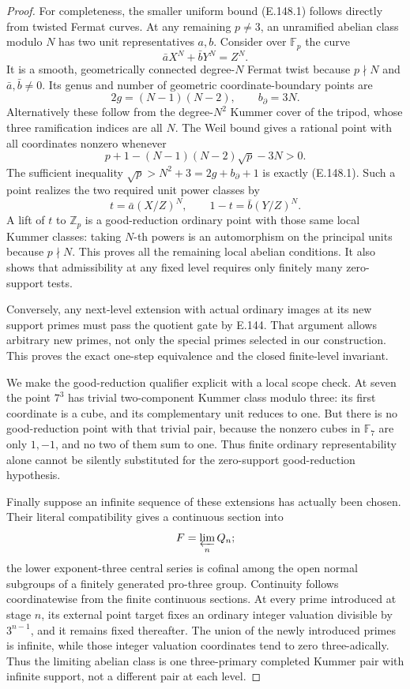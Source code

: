 \begin{proof}
For completeness, the smaller uniform
bound (E.148.1) follows directly from
twisted Fermat curves.
At any remaining \(p\ne3\), an unramified
abelian class modulo \(N\) has two
unit representatives \(a,b\).
Consider over \(\mathbb F_p\) the curve
\[
                  \bar aX^N+\bar bY^N=Z^N.
 \tag{E.148.7}
\]
It is a smooth, geometrically connected
degree-\(N\) Fermat twist because
\(p\nmid N\) and \(\bar a,\bar b\ne0\).
Its genus and number of geometric
coordinate-boundary points are
\[
          2g=(N-1)(N-2),\qquad b_{\partial}=3N.
 \tag{E.148.8}
\]
Alternatively these follow from the
degree-\(N^2\) Kummer cover of the
tripod, whose three ramification
indices are all \(N\).
The Weil bound
\citep[(1.5.1)--(1.6), pp.275--276]{RootDeligne1974}
gives a rational point
with all coordinates nonzero whenever
\[
 p+1-(N-1)(N-2)\sqrt p-3N>0.
 \]
The sufficient inequality
\(\sqrt p>N^2+3=2g+b_{\partial}+1\)
is exactly (E.148.1).
Such a point realizes the two required
unit power classes by
\[
 t=\bar a(X/Z)^N,\qquad
 1-t=\bar b(Y/Z)^N .
 \]
A lift of \(t\) to \(\mathbb Z_p\)
is a good-reduction ordinary point
with those same local Kummer classes:
taking \(N\)-th powers is an automorphism
on the principal units because \(p\nmid N\).
This proves all the remaining local
abelian conditions.
It also shows that admissibility at
any fixed level requires only finitely
many zero-support tests.

Conversely, any next-level extension
with actual ordinary images at its
new support primes must pass the
quotient gate by E.144.
That argument allows arbitrary new
primes, not only the special primes
selected in our construction.
This proves the exact one-step
equivalence and the closed finite-level
invariant.

We make the good-reduction qualifier
explicit with a local scope check.
At seven the point \(7^3\) has trivial
two-component Kummer class modulo three:
its first coordinate is a cube, and
its complementary unit reduces to one.
But there is no good-reduction point
with that trivial pair, because the
nonzero cubes in \(\mathbb F_7\) are
only \(1,-1\), and no two of them
sum to one. Thus finite ordinary
representability alone cannot be
silently substituted for the
zero-support good-reduction hypothesis.

Finally suppose an infinite sequence
of these extensions has actually
been chosen.
Their literal compatibility gives
a continuous section into
\[
                          F=\varprojlim_n Q_n;
 \]
the lower exponent-three central
series is cofinal among the open
normal subgroups of a finitely
generated pro-three group.
Continuity follows coordinatewise
from the finite continuous sections.
At every prime introduced at stage
\(n\), its external point target
fixes an ordinary integer valuation
divisible by \(3^{n-1}\), and it
remains fixed thereafter.
The union of the newly introduced
primes is infinite, while those
integer valuation coordinates tend
to zero three-adically.
Thus the limiting abelian class is
one three-primary completed Kummer
pair with infinite support, not a
different pair at each level.


\end{proof}
